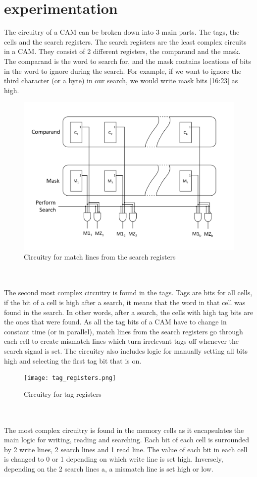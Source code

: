\section{experimentation}
The circuitry of a CAM can be broken down into 3 main parts. The tags, the cells and the search registers. 
The search registers are the least complex circuits in a CAM. They consist of 2 different registers, the comparand and the mask. 
The comparand is the word to search for, and the mask contains locations of bits in the word to ignore during the search.
For example, if we want to ignore the third character (or a byte) in our search, we would write mask bits [16:23] as high.
\begin{figure}
    \includegraphics[width=1\columnwidth]{search_registers.png}
    \caption[Short text]{Circuitry for match lines from the search registers}
\end{figure}
\\\\
The second most complex circuitry is found in the tags.
Tags are bits for all cells, if the bit of a cell is high after a search, it means that the word in that cell was found in the search. 
In other words, after a search, the cells with high tag bits are the ones that were found. 
As all the tag bits of a CAM have to change in constant time (or in parallel), match lines from the search registers go through each cell to create mismatch lines which turn irrelevant tags off whenever the search signal is set.
The circuitry also includes logic for manually setting all bits high and selecting the first tag bit that is on.
\begin{figure}
    \texttt{[image: tag\_registers.png]}
    \caption[Short text]{Circuitry for tag registers}
\end{figure}
\\\\
The most complex circuitry is found in the memory cells as it encapsulates the main logic for writing, reading and searching. 
Each bit of each cell is surrounded by 2 write lines, 2 search lines and 1 read line. 
The value of each bit in each cell is changed to 0 or 1 depending on which write line is set high. 
Inversely, depending on the 2 search lines a, a mismatch line is set high or low. 